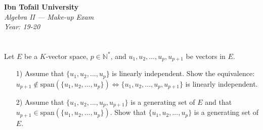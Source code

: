 \documentclass[12pt]{article}
\begin{document}
\begin{center}
  \Large\textbf{Ibn Tofail University} \\[1em]
  \large\textit{Algebra II — Make-up Exam} \\[0.5em]
  \large\textit{Year: 19-20} \\[2em]
\end{center}

\vspace{0.5cm}

\section{}
Let $E$ be a $K$-vector space, $p \in \mathbb{N}^*$, and $u_1, u_2, ..., u_p, u_{p+1}$ be vectors in $E$.

\begin{enumerate}
    \item[1)] Assume that $\{u_1, u_2, ..., u_p\}$ is linearly independent. Show the equivalence:\\
    $u_{p+1} \notin \text{span}(\{u_1, u_2, ..., u_p\}) \Leftrightarrow \{u_1, u_2, ..., u_p, u_{p+1}\}$ is linearly independent.
    
    \item[2)] Assume that $\{u_1, u_2, ..., u_p, u_{p+1}\}$ is a generating set of $E$ and that\\
    $u_{p+1} \in \text{span}(\{u_1, u_2, ..., u_p\})$. Show that $\{u_1, u_2, ..., u_p\}$ is a generating set of $E$.
\end{enumerate}

\newpage
\end{document}
